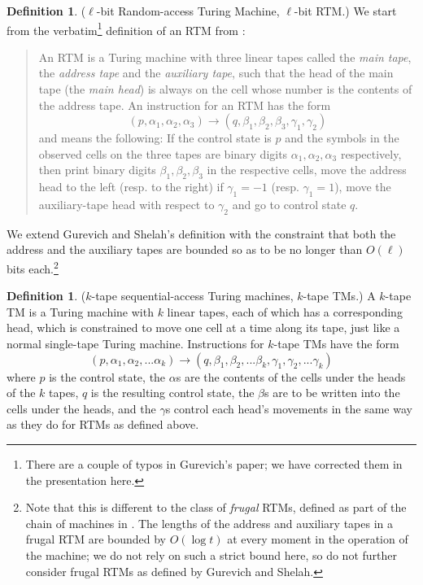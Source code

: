\documentclass[english]{article}
\theoremstyle{plain}
\theoremstyle{definition}
\newtheorem{defn}[thm]{Definition}
\theoremstyle{plain}
\begin{document}
\begin{defn}
  ($\ell$-bit Random-access Turing Machine, $\ell$-bit RTM.) We start
  from the verbatim\footnote{There are a couple of typos in Gurevich's
    paper; we have corrected them in the presentation here.}
  definition of an RTM from \cite{DBLP:conf/ershov/GurevichS89}:

  \begin{quote}
    An RTM is a Turing machine with three linear tapes called the
    \emph{main tape}, the \emph{address tape} and the \emph{auxiliary
      tape}, such that the head of the main tape (the \emph{main
      head}) is always on the cell whose number is the contents of the
    address tape. An instruction for an RTM has the form
    \begin{equation*}
      (p,\alpha_1,\alpha_2,\alpha_3) \rightarrow
      (q,\beta_1,\beta_2,\beta_3,\gamma_1,\gamma_2)
    \end{equation*}
    and means the following: If the control state is $p$ and the
    symbols in the observed cells on the three tapes are binary digits
    $\alpha_1,\alpha_2,\alpha_3$ respectively, then print binary
    digits $\beta_1,\beta_2,\beta_3$ in the respective cells, move the
    address head to the left (resp. to the right) if $\gamma_1=-1$
    (resp. $\gamma_1=1$), move the auxiliary-tape head with respect
    to $\gamma_2$ and go to control state $q$.
  \end{quote}

  We extend Gurevich and Shelah's definition with the constraint that
  both the address and the auxiliary tapes are bounded so as to be no
  longer than $O(\ell)$ bits each.\footnote{Note that this is
    different to the class of \emph{frugal} RTMs, defined as part of
    the chain of machines in \cite{DBLP:conf/ershov/GurevichS89}. The
    lengths of the address and auxiliary tapes in a frugal RTM are
    bounded by $O(\log t)$ at every moment in the operation of the
    machine; we do not rely on such a strict bound here, so do not
    further consider frugal RTMs as defined by Gurevich and Shelah.}
\end{defn}

\begin{defn}
  ($k$-tape sequential-access Turing machines, $k$-tape TMs.) A
  $k$-tape TM is a Turing machine with $k$ linear tapes, each of which
  has a corresponding head, which is constrained to move one cell at a
  time along its tape, just like a normal single-tape Turing
  machine. Instructions for $k$-tape TMs have the form
  \begin{equation*}
    (p,\alpha_1,\alpha_2,...\alpha_k) \rightarrow
    (q,\beta_1,\beta_2,...\beta_k,\gamma_1,\gamma_2,...\gamma_k)
  \end{equation*}
  where $p$ is the control state, the $\alpha$s are the contents of
  the cells under the heads of the $k$ tapes, $q$ is the resulting
  control state, the $\beta$s are to be written into the cells under
  the heads, and the $\gamma$s control each head's movements in the
  same way as they do for RTMs as defined above.
\end{defn}
\end{document}

